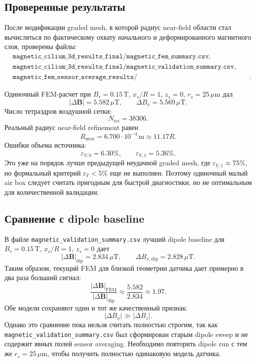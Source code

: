 \documentclass[12pt,a4paper]{article}
\begin{document}
\subsection*{Проверенные результаты}

После модификации graded mesh, в которой радиус near-field области стал
вычисляться по фактическому охвату начального и деформированного магнитного
слоя, проверены файлы:
\[
\begin{aligned}
&\texttt{magnetic\_cilium\_3d\_results\_final/magnetic\_fem\_summary.csv},\\
&\texttt{magnetic\_cilium\_3d\_results\_final/magnetic\_validation\_summary.csv},\\
&\texttt{magnetic\_fem\_sensor\_average\_results/magnetic\_sensor\_average\_validation\_summary.csv}.
\end{aligned}
\]

Одиночный FEM-расчет при \(B_r=0.15\,\mathrm{T}\), \(x_s/R=1\),
\(z_s=0\), \(r_s=25\,\mu\mathrm{m}\) дал
\[
    |\Delta\mathbf B| = 5.582\,\mu\mathrm{T},\qquad
    \Delta B_x = 5.569\,\mu\mathrm{T}.
\]
Число тетраэдров воздушной сетки:
\[
    N_{\mathrm{tet}} = 38306.
\]
Реальный радиус near-field refinement равен
\[
    R_{\mathrm{near}} = 6.700\cdot 10^{-4}\,\mathrm{m}
    \approx 11.17R.
\]
Ошибки объема источника:
\[
    \varepsilon_{V,0}=6.30\%,\qquad
    \varepsilon_{V,1}=5.36\%.
\]
Это уже на порядок лучше предыдущей неудачной graded mesh, где
\(\varepsilon_{V,1}\approx 75\%\), но формальный критерий
\(\varepsilon_V<5\%\) еще не выполнен. Поэтому одиночный малый air box следует
считать пригодным для быстрой диагностики, но не оптимальным для количественной
валидации.

\subsection*{Сравнение с dipole baseline}

В файле \texttt{magnetic\_validation\_summary.csv} лучший dipole baseline для
\(B_r=0.15\,\mathrm{T}\), \(x_s/R=1\), \(z_s=0\) дает
\[
    |\Delta\mathbf B|_{\mathrm{dip}} = 2.834\,\mu\mathrm{T},
    \qquad
    \Delta B_{x,\mathrm{dip}} = 2.828\,\mu\mathrm{T}.
\]
Таким образом, текущий FEM для близкой геометрии датчика дает примерно в два
раза больший сигнал:
\[
    \frac{|\Delta\mathbf B|_{\mathrm{FEM}}}
         {|\Delta\mathbf B|_{\mathrm{dip}}}
    \approx
    \frac{5.582}{2.834}
    \approx 1.97.
\]
Обе модели сохраняют один и тот же качественный признак:
\[
    |\Delta B_x| \gg |\Delta B_z|.
\]
Однако это сравнение пока нельзя считать полностью строгим, так как
\texttt{magnetic\_validation\_summary.csv} был сформирован старым dipole sweep и
не содержит явных полей sensor averaging. Необходимо повторить dipole run с тем
же \(r_s=25\,\mu\mathrm{m}\), чтобы получить полностью одинаковую модель
датчика.
\end{document}
